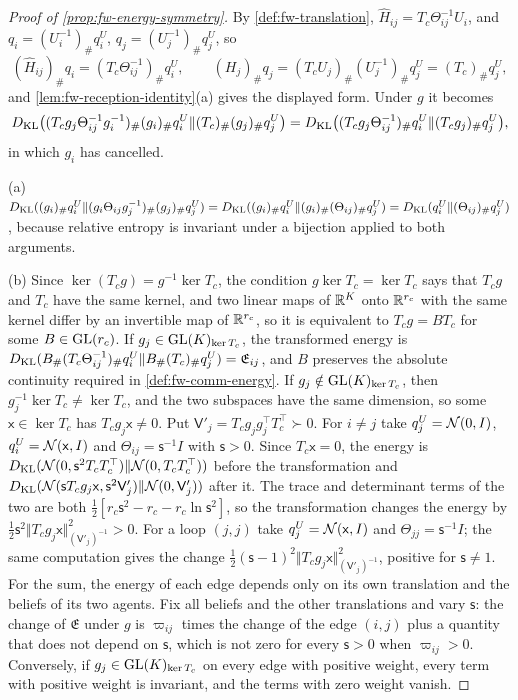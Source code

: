\begin{proof}[Proof of \cref{prop:fw-energy-symmetry}]
By \cref{def:fw-translation}, $\hat H_{ij}=T_c\Theta_{ij}^{-1}U_i$, and $q_i=(U_i^{-1})_\#q^U_i$, $q_j=(U_j^{-1})_\#q^U_j$, so
\[
(\hat H_{ij})_\#q_i=(T_c\Theta_{ij}^{-1})_\#q^U_i,\qquad(H_j)_\#q_j=(T_cU_j)_\#(U_j^{-1})_\#q^U_j=(T_c)_\#q^U_j,
\]
and \cref{lem:fw-reception-identity}(a) gives the displayed form. Under $g$ it becomes
\[
D_{\mathrm{KL}}\bigl((T_cg_j\Theta_{ij}^{-1}g_i^{-1})_\#(g_i)_\#q^U_i\Vert(T_c)_\#(g_j)_\#q^U_j\bigr)=D_{\mathrm{KL}}\bigl((T_cg_j\Theta_{ij}^{-1})_\#q^U_i\Vert(T_cg_j)_\#q^U_j\bigr),
\]
in which $g_i$ has cancelled.

(a) $D_{\mathrm{KL}}((g_i)_\#q^U_i\Vert(g_i\Theta_{ij}g_j^{-1})_\#(g_j)_\#q^U_j)=D_{\mathrm{KL}}((g_i)_\#q^U_i\Vert(g_i)_\#(\Theta_{ij})_\#q^U_j)=D_{\mathrm{KL}}(q^U_i\Vert(\Theta_{ij})_\#q^U_j)$, because relative entropy is invariant under a bijection applied to both arguments.

(b) Since $\ker(T_cg)=g^{-1}\ker T_c$, the condition $g\ker T_c=\ker T_c$ says that $T_cg$ and $T_c$ have the same kernel, and two linear maps of $\mathbb{R}^K$ onto $\mathbb{R}^{r_c}$ with the same kernel differ by an invertible map of $\mathbb{R}^{r_c}$, so it is equivalent to $T_cg=BT_c$ for some $B\in\mathrm{GL}(r_c)$. If $g_j\in\mathrm{GL}(K)_{\ker T_c}$, the transformed energy is $D_{\mathrm{KL}}(B_\#(T_c\Theta_{ij}^{-1})_\#q^U_i\Vert B_\#(T_c)_\#q^U_j)=\mathfrak E_{ij}$, and $B$ preserves the absolute continuity required in \cref{def:fw-comm-energy}. If $g_j\notin\mathrm{GL}(K)_{\ker T_c}$, then $g_j^{-1}\ker T_c\ne\ker T_c$, and the two subspaces have the same dimension, so some $\mathsf x\in\ker T_c$ has $T_cg_j\mathsf x\ne0$. Put $\mathsf V'_j=T_cg_jg_j^\top T_c^\top\succ0$. For $i\ne j$ take $q^U_j=\mathcal{N}(0,I)$, $q^U_i=\mathcal{N}(\mathsf x,I)$ and $\Theta_{ij}=\mathsf s^{-1}I$ with $\mathsf s>0$. Since $T_c\mathsf x=0$, the energy is $D_{\mathrm{KL}}(\mathcal{N}(0,\mathsf s^2T_cT_c^\top)\Vert\mathcal{N}(0,T_cT_c^\top))$ before the transformation and $D_{\mathrm{KL}}(\mathcal{N}(\mathsf sT_cg_j\mathsf x,\mathsf s^2\mathsf V'_j)\Vert\mathcal{N}(0,\mathsf V'_j))$ after it. The trace and determinant terms of the two are both $\tfrac12[r_c\mathsf s^2-r_c-r_c\ln\mathsf s^2]$, so the transformation changes the energy by $\tfrac12\mathsf s^2\Vert T_cg_j\mathsf x\Vert^2_{(\mathsf V'_j)^{-1}}>0$. For a loop $(j,j)$ take $q^U_j=\mathcal{N}(\mathsf x,I)$ and $\Theta_{jj}=\mathsf s^{-1}I$; the same computation gives the change $\tfrac12(\mathsf s-1)^2\Vert T_cg_j\mathsf x\Vert^2_{(\mathsf V'_j)^{-1}}$, positive for $\mathsf s\ne1$. For the sum, the energy of each edge depends only on its own translation and the beliefs of its two agents. Fix all beliefs and the other translations and vary $\mathsf s$: the change of $\mathfrak E$ under $g$ is $\varpi_{ij}$ times the change of the edge $(i,j)$ plus a quantity that does not depend on $\mathsf s$, which is not zero for every $\mathsf s>0$ when $\varpi_{ij}>0$. Conversely, if $g_j\in\mathrm{GL}(K)_{\ker T_c}$ on every edge with positive weight, every term with positive weight is invariant, and the terms with zero weight vanish.


\end{proof}

